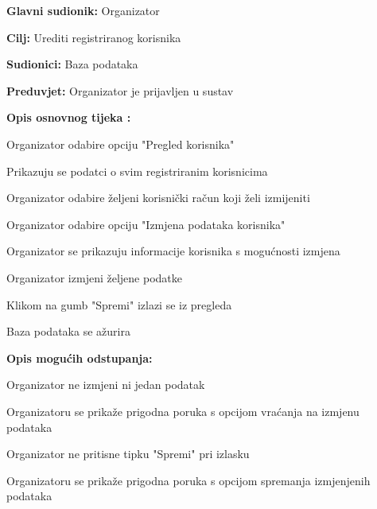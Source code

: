 					\noindent {}
					\begin{packed_item}
						
						\item \textbf{Glavni sudionik: } Organizator
						\item  \textbf{Cilj:} Urediti registriranog korisnika
						\item  \textbf{Sudionici:} Baza podataka
						\item  \textbf{Preduvjet:} Organizator je prijavljen u sustav
						\item  \textbf{Opis osnovnog tijeka :}
						
						\item[] \begin{packed_enum}
							
							\item Organizator odabire opciju "Pregled korisnika"
							\item Prikazuju se podatci o svim registriranim korisnicima
							\item Organizator odabire željeni korisnički račun koji želi izmijeniti
							\item Organizator odabire opciju "Izmjena podataka korisnika"
							\item Organizator se prikazuju informacije korisnika s mogućnosti izmjena
							\item Organizator izmjeni željene podatke
							\item Klikom na gumb "Spremi" izlazi se iz pregleda
							\item Baza podataka se ažurira
						\end{packed_enum}
						
						\item  \textbf{Opis mogućih odstupanja:}
						
						\item[] \begin{packed_item}
							
							\item[2.a] Organizator ne izmjeni ni jedan podatak
							\item[] \begin{packed_enum}
								
								\item Organizatoru se prikaže prigodna poruka s opcijom vraćanja na izmjenu podataka
								
							\end{packed_enum}
							\item[4.b] Organizator ne pritisne tipku "Spremi" pri izlasku
							\item[] \begin{packed_enum}
								
								\item Organizatoru se prikaže prigodna poruka s opcijom spremanja izmjenjenih podataka
								
							\end{packed_enum}
						\end{packed_item}
					\end{packed_item}
					
